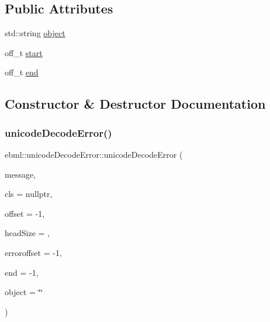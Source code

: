 \subsection*{Public Attributes}
\begin{DoxyCompactItemize}
\item 
std\+::string \mbox{\hyperlink{classebml_1_1unicodeDecodeError_a7a5d70226de247efb69088d0169c3dff}{object}}
\item 
off\+\_\+t \mbox{\hyperlink{classebml_1_1unicodeDecodeError_a1b1055d23aa5b2ad59b00d07ad14ab7f}{start}}
\item 
off\+\_\+t \mbox{\hyperlink{classebml_1_1unicodeDecodeError_aa04987ff9110293b4a5f847303559371}{end}}
\end{DoxyCompactItemize}


\subsection{Constructor \& Destructor Documentation}
\mbox{\label{classebml_1_1unicodeDecodeError_a585952785a9a0aaeb39e65e81bbabe20}} 
\subsubsection{\texorpdfstring{unicode\+Decode\+Error()}{unicodeDecodeError()}}
{\footnotesize\ttfamily ebml\+::unicode\+Decode\+Error\+::unicode\+Decode\+Error (\begin{DoxyParamCaption}\item[{const std\+::string \&}]{message,  }\item[{const \mbox{\hyperlink{classebml_1_1ebmlElementClass}{ebml\+Element\+Class}} $\ast$}]{cls = {\ttfamily nullptr},  }\item[{off\+\_\+t}]{offset = {\ttfamily -\/1},  }\item[{unsigned char}]{head\+Size = {},  }\item[{off\+\_\+t}]{erroroffset = {\ttfamily -\/1},  }\item[{off\+\_\+t}]{end = {\ttfamily -\/1},  }\item[{const std\+::string \&}]{object = {\ttfamily \char`\"{}\char`\"{}} }\end{DoxyParamCaption})}



